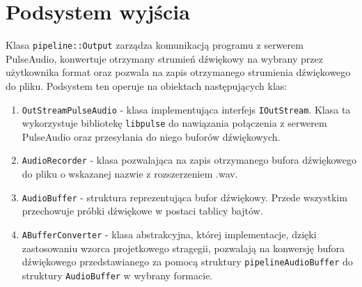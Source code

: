 \section{Podsystem wyjścia}
Klasa \texttt{pipeline::Output} zarządza komunikacją programu z serwerem PulseAudio\cite{bib:PulseAudio}, konwertuje otrzymany strumień dźwiękowy na wybrany przez użytkownika format oraz pozwala na zapis otrzymanego strumienia dźwiękowego do pliku. Podsystem ten operuje na obiektach następujących klas:
\begin{enumerate}
    \item \texttt{OutStreamPulseAudio\cite{bib:PulseAudio}} - klasa implementująca interfejs \texttt{IOutStream}. Klasa ta wykorzystuje bibliotekę \texttt{libpulse} do nawiązania połączenia z serwerem PulseAudio\cite{bib:PulseAudio} oraz przesyłania do niego buforów dźwiękowych.
    \item \texttt{AudioRecorder} - klasa pozwalająca na zapis otrzymanego bufora dźwiękowego do pliku o wskazanej nazwie z rozszerzeniem .wav.
    \item \texttt{AudioBuffer} - struktura reprezentująca bufor dźwiękowy. Przede wszystkim przechowuje próbki dźwiękowe w postaci tablicy bajtów.
    \item \texttt{ABufferConverter} - klasa abstrakcyjna, której implementacje, dzięki zastosowaniu wzorca projetkowego stragegii\cite{bib:DesignPatterns}, pozwalają na konwersję bufora dźwiękowego przedstawianego za pomocą struktury \texttt{pipelineAudioBuffer} do struktury \texttt{AudioBuffer} w wybrany formacie. 
\end{enumerate}

